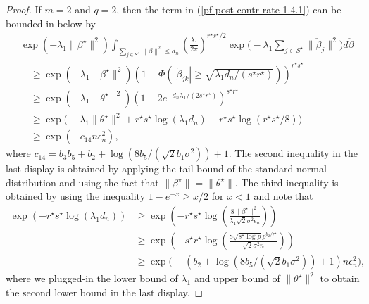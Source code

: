 \documentclass[pdftex, noinfoline, letter]{imsart}
\theoremstyle{plain}
\begin{document}
\begin{proof}
If $m = 2$ and $q = 2$, then the term in (\ref{pf-post-contr-rate-1.4.1}) can be bounded in below by 
\begin{align*}
& \exp(-\lambda_1 \|\beta^\star\|^2) \int_{\sum_{j\in S^\star} \|\check{\beta}\|^2 \leq d_n}
\left(\frac{\lambda_1}{2\pi}\right)^{r^\star s^\star/2} 
\exp\Big( - \lambda_1 \sum_{j\in S^\star} \|\check\beta_j\|^2 \Big) d\check\beta \\
& \quad \geq \exp(-\lambda_1 \|\beta^\star\|^2) 
\left(1 - \Phi(|\check\beta_{jk}| \geq \sqrt{\lambda_1 d_n/(s^\star r^\star)})\right)^{r^\star s^\star}\\
& \quad \geq \exp(-\lambda_1 \|\theta^\star\|^2) \left(1 - 2e^{-d_n\lambda_1 / (2s^\star r^\star)}\right)^{s^\star r^\star}\\
& \quad \geq \exp\Big(- \lambda_1\|\theta^\star\|^2 + r^\star s^\star \log (\lambda_1 d_n) - r^\star s^\star \log (r^\star s^\star /8)\Big) \\
& \quad \geq \exp(-c_{14}n\epsilon_n^2),
\end{align*}
where $c_{14} = b_3 b_5 + b_2 + \log(8b_5/(\sqrt{2}b_1\sigma^2)) + 1$.
The second inequality in the last display is obtained by applying the tail bound of the standard normal distribution and using the fact that $\|\beta^\star\| = \|\theta^\star\|$. The third inequality is obtained by using the inequality $1 - e^{-x} \geq x/2$ for $x < 1$ and note that 
\begin{align*}
\exp(-r^\star s^\star \log(\lambda_1 d_n)) &\geq \exp\left(-r^\star s^\star \log \left(\frac{8\|\beta^\star\|^2}{\lambda_1 \sqrt{2}\sigma^2 \epsilon_n}\right) \right)\\
& \geq \exp\left(-s^\star r^\star \log \left(
\frac{8 \sqrt{s^\star \log p} p^{b_2/r^\star}}{\sqrt{2} \sigma^2 n}
\right) \right) \\
& \geq \exp\Big(-(b_2 + \log(8b_5/(\sqrt{2}b_1\sigma^2)) + 1) n\epsilon_n^2\Big),
\end{align*}
where we plugged-in the lower bound of $\lambda_1$ and upper bound of $\|\theta^\star\|^2$ to obtain the second lower bound in the last display.
\end{proof}
\end{document}
